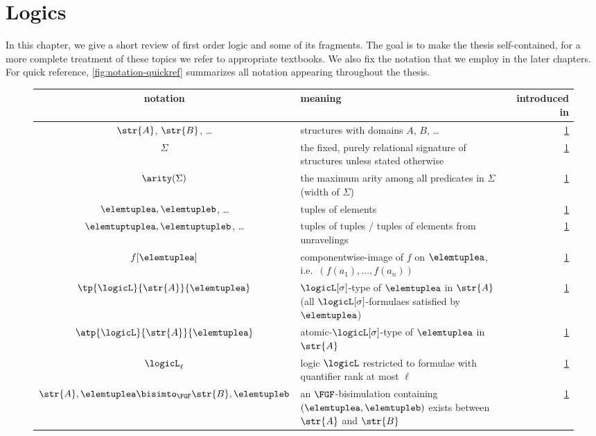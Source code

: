 \chapter{Logics}\label{chap:logics}

In this chapter, we give a short review of first order logic and some of its fragments.
The goal is to make the thesis self-contained, for a more complete treatment of these topics we refer to appropriate textbooks\cite{Libkin04,monk1976}.
We also fix the notation that we employ in the later chapters.
For quick reference, \cref{fig:notation-quickref} summarizes all notation appearing throughout the thesis.
\begin{figure}
  \centering
  \bgroup
  \def\arraystretch{1.1}
  \begin{tabularx}{\textwidth}{c X r}
    notation & meaning & introduced in \\
    \hline
    $\str{A}$, $\str{B}$, \ldots & structures with domains $A$, $B$, \ldots & \cref{chap:logics} \\
    $\Sigma$ & the fixed, purely relational signature of structures unless stated otherwise & \cref{chap:logics} \\
    $\arity(\Sigma)$ & the maximum arity among all predicates in $\Sigma$ (width of $\Sigma$) & \cref{chap:logics} \\
    $\elemtuplea, \elemtupleb$, \ldots & tuples of elements & \cref{chap:logics} \\
    $\elemtuptuplea, \elemtuptupleb$, \ldots & tuples of tuples / tuples of elements from unravelings & \cref{chap:logics} \\
    $f[\elemtuplea]$ & componentwise-image of $f$ on $\elemtuplea$, i.e.\ $(f(a_{1}), \ldots, f(a_{n}))$ & \cref{chap:logics} \\
    $\tp{\logicL}{\str{A}}{\elemtuplea}$ & $\logicL[\sigma]$-type of $\elemtuplea$ in $\str{A}$ (all $\logicL[\sigma]$-formulaes satisfied by $\elemtuplea$) & \cref{chap:logics} \\
    $\atp{\logicL}{\str{A}}{\elemtuplea}$ & atomic-$\logicL[\sigma]$-type of $\elemtuplea$ in $\str{A}$ & \cref{chap:logics} \\
    $\logicL_{\ell}$ & logic $\logicL$ restricted to formulae with quantifier rank at most $\ell$ & \cref{chap:logics} \\
    $\str{A}, \elemtuplea \bisimto_{\FGF} \str{B}, \elemtupleb$ & an $\FGF$-bisimulation containing $(\elemtuplea, \elemtupleb)$ exists between $\str{A}$ and $\str{B}$ & \cref{chap:logics} \\

\end{tabularx}
\end{figure}
